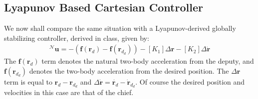 \documentclass[conf]{new-aiaa}
\begin{document}
\begin{singlespace}
\subsection{Lyapunov Based Cartesian Controller}
We now shall compare the same situation with a Lyapunov-derived globally stabilizing controller, derived in class, given by:
\begin{align}
    ^\mathcal{N}\boldsymbol{u}=-\left(\boldsymbol{f}\left(\boldsymbol{r}_{d}\right)-\boldsymbol{f}\left(\boldsymbol{r}_{d_{d}}\right)\right)-\left[K_{1}\right] \Delta \boldsymbol{r}-\left[K_{2}\right] \Delta \boldsymbol{\dot { r }}
\end{align}
The $\boldsymbol{f}\left(\boldsymbol{r}_{d}\right)$ term denotes the natural two-body acceleration from the deputy, and $\boldsymbol{f}\left(\boldsymbol{r}_{d_{d}}\right)$ denotes the two-body acceleration from the desired position. The $\Delta\bm{r}$ term is equal to $\bm{r}_d - \bm{r}_{d_d}$ and $\Delta\dot{\bm{r}} = \dot{\bm{r}_d} - \dot{\bm{r}}_{d_d}$. Of course the desired position and velocities in this case are that of the chief.


\end{singlespace}
\end{document}
